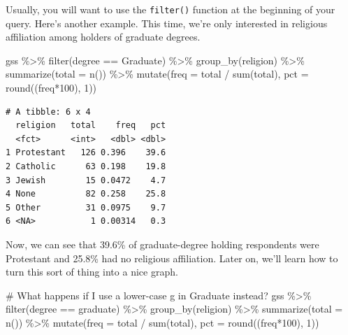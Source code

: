 \documentclass[
  letterpaper,
]{book}
\newenvironment{Shaded}{\begin{snugshade}}{\end{snugshade}}
\newcommand{\AttributeTok}[1]{\textcolor[rgb]{0.40,0.45,0.13}{#1}}
\newcommand{\CommentTok}[1]{\textcolor[rgb]{0.37,0.37,0.37}{#1}}
\newcommand{\DecValTok}[1]{\textcolor[rgb]{0.68,0.00,0.00}{#1}}
\newcommand{\FunctionTok}[1]{\textcolor[rgb]{0.28,0.35,0.67}{#1}}
\newcommand{\NormalTok}[1]{\textcolor[rgb]{0.00,0.23,0.31}{#1}}
\newcommand{\SpecialCharTok}[1]{\textcolor[rgb]{0.37,0.37,0.37}{#1}}
\newcommand{\StringTok}[1]{\textcolor[rgb]{0.13,0.47,0.30}{#1}}
\begin{document}
Usually, you will want to use the \texttt{filter()} function at the
beginning of your query. Here's another example. This time, we're only
interested in religious affiliation among holders of graduate degrees.

\begin{Shaded}
\begin{Highlighting}[]
\NormalTok{gss }\SpecialCharTok{\%\textgreater{}\%}
  \FunctionTok{filter}\NormalTok{(degree }\SpecialCharTok{==} \StringTok{\textquotesingle{}Graduate\textquotesingle{}}\NormalTok{) }\SpecialCharTok{\%\textgreater{}\%}
  \FunctionTok{group\_by}\NormalTok{(religion) }\SpecialCharTok{\%\textgreater{}\%}
  \FunctionTok{summarize}\NormalTok{(}\AttributeTok{total =} \FunctionTok{n}\NormalTok{()) }\SpecialCharTok{\%\textgreater{}\%}
  \FunctionTok{mutate}\NormalTok{(}\AttributeTok{freq =}\NormalTok{ total }\SpecialCharTok{/} \FunctionTok{sum}\NormalTok{(total),}
         \AttributeTok{pct =} \FunctionTok{round}\NormalTok{((freq}\SpecialCharTok{*}\DecValTok{100}\NormalTok{), }\DecValTok{1}\NormalTok{))}
\end{Highlighting}
\end{Shaded}

\begin{verbatim}
# A tibble: 6 x 4
  religion   total    freq   pct
  <fct>      <int>   <dbl> <dbl>
1 Protestant   126 0.396    39.6
2 Catholic      63 0.198    19.8
3 Jewish        15 0.0472    4.7
4 None          82 0.258    25.8
5 Other         31 0.0975    9.7
6 <NA>           1 0.00314   0.3
\end{verbatim}

Now, we can see that 39.6\% of graduate-degree holding respondents were
Protestant and 25.8\% had no religious affiliation. Later on, we'll
learn how to turn this sort of thing into a nice graph.

\begin{Shaded}
\begin{Highlighting}[]
\CommentTok{\# What happens if I use a lower{-}case \textquotesingle{}g\textquotesingle{} in \textquotesingle{}Graduate\textquotesingle{} instead?}
\NormalTok{gss }\SpecialCharTok{\%\textgreater{}\%}
  \FunctionTok{filter}\NormalTok{(degree }\SpecialCharTok{==} \StringTok{\textquotesingle{}graduate\textquotesingle{}}\NormalTok{) }\SpecialCharTok{\%\textgreater{}\%}
  \FunctionTok{group\_by}\NormalTok{(religion) }\SpecialCharTok{\%\textgreater{}\%}
  \FunctionTok{summarize}\NormalTok{(}\AttributeTok{total =} \FunctionTok{n}\NormalTok{()) }\SpecialCharTok{\%\textgreater{}\%}
  \FunctionTok{mutate}\NormalTok{(}\AttributeTok{freq =}\NormalTok{ total }\SpecialCharTok{/} \FunctionTok{sum}\NormalTok{(total),}
         \AttributeTok{pct =} \FunctionTok{round}\NormalTok{((freq}\SpecialCharTok{*}\DecValTok{100}\NormalTok{), }\DecValTok{1}\NormalTok{))}
\end{Highlighting}
\end{Shaded}
\end{document}
